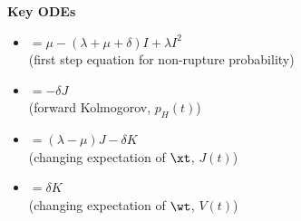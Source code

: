 \noindent
\textbf{Key ODEs}
\begin{itemize}[leftmargin=\indentA]
\item[$\ddt{I}$]$ = \mu - (\lambda + \mu + \delta) I + \lambda I^2$ \\(first step equation for non-rupture probability)
\item[$\ddt{I}$]$= -\delta J$ \\(forward Kolmogorov, $p_{H}(t)$)
\item[$\ddt{J} $]$= (\lambda - \mu)J - \delta K$ \\(changing expectation of $\xt$, $J(t)$)
\item[$\ddt{V}$]$= \delta K $ \\(changing expectation of $\wt$, $V(t)$)
\end{itemize}



